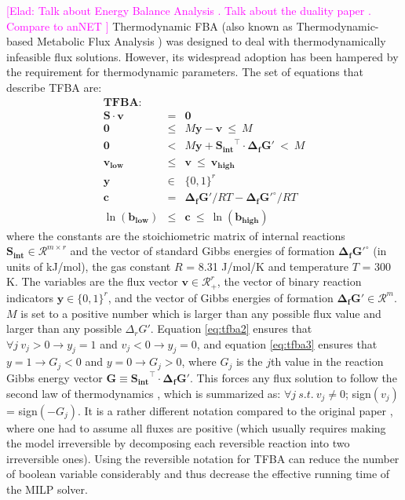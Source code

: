 \documentclass[twocolumn]{bmcart}%
\newcommand{\elad}[1]{{\textcolor{magenta}{[Elad: {#1}]}}}
\newcommand{\Sint}{\mathbf{S_{int}}}
\begin{document}
\elad{Talk about Energy Balance Analysis \cite{Beard2002-xt}. Talk about the duality paper \cite{Warren2007-wm}. Compare to anNET \cite{Matthias2008, Kuemmel2006}}
Thermodynamic FBA (also known as Thermo\-dynamic-based Metabolic Flux Analysis \cite{Henry2007-xp}) was designed to deal with thermodynamically infeasible flux solutions. However, its widespread adoption has been hampered by the requirement for thermodynamic parameters. The set of equations that describe TFBA are:
\begin{eqnarray}
\textbf{TFBA:} && \nonumber\\
\mathbf{S} \cdot \mathbf{v} &=& \mathbf{0}  \label{eq:tfba1} \\
\mathbf{0} &\leq& M \mathbf{y} - \mathbf{v} ~\leq~ M
\label{eq:tfba2} \\
\mathbf{0} &<& M \mathbf{y} + \Sint^\top \cdot \mathbf{\Delta_f G'} ~<~ M \label{eq:tfba3} \\
\mathbf{v_{low}} &\leq& \mathbf{v} ~\leq~ \mathbf{v_{high}} \label{eq:tfba4}\\
\mathbf{y} &\in& \{0, 1\}^r \label{eq:tfba5}\\
\mathbf{c} &=& \mathbf{\Delta_f G'}/RT - \mathbf{\Delta_f G'^\circ}/RT \label{eq:tfba6}\\
\ln(\mathbf{b_{low}}) &\leq& \mathbf{c} ~\leq~ \ln(\mathbf{b_{high}}) \label{eq:tfba7}
\end{eqnarray}
where the constants are the stoichiometric matrix of internal reactions $\Sint \in \mathcal{R}^{m \times r}$  and the vector of standard Gibbs energies of formation $\mathbf{\Delta_f G'^\circ}$ (in units of kJ/mol), the gas constant $R$ = 8.31 J/mol/K and temperature $T$ = 300 K. The variables are the flux vector $\mathbf{v} \in \mathcal{R}_{+}^{r}$, the vector of binary reaction indicators $\mathbf{y} \in \{0,1\}^{r}$, and the vector of Gibbs energies of formation $\mathbf{\Delta_f G'} \in \mathcal{R}^{m}$. $M$ is set to a positive number which is larger than any possible flux value and larger than any possible $\Delta_r G'$. Equation \ref{eq:tfba2} ensures that $\forall j~v_j > 0 \rightarrow y_j = 1$ and $v_j < 0 \rightarrow y_j = 0$, and equation \ref{eq:tfba3} ensures that $y = 1 \rightarrow G_j < 0$ and $y = 0 \rightarrow G_j > 0$, where $G_j$ is the $j$th value in the reaction Gibbs energy vector $\mathbf{G} \equiv \Sint^\top \cdot \mathbf{\Delta_f G'}$. This forces any flux solution to follow the second law of thermodynamics \cite{Hoppe2007-sw, Machado2017-gh}, which is summarized as: $\forall j~s.t.~ v_j \neq 0$; sign$(v_j)$ = sign$(-G_j)$. It is a rather different notation compared to the original paper \cite{Henry2007-xp}, where one had to assume all fluxes are positive (which usually requires making the model irreversible by decomposing each reversible reaction into two irreversible ones). Using the reversible notation for TFBA can reduce the number of boolean variable considerably and thus decrease the effective running time of the MILP solver.
\end{document}
